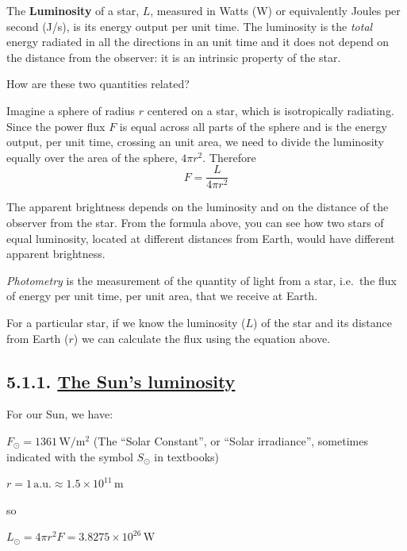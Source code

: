 \documentclass[
  letterpaper,
  DIV=11,
  numbers=noendperiod]{scrreprt}
\begin{document}
The \textbf{Luminosity} of a star, \(L\), measured in Watts (W) or
equivalently Joules per second (J/s), is its energy output per unit
time. The luminosity is the \emph{total} energy radiated in all the
directions in an unit time and it does not depend on the distance from
the observer: it is an intrinsic property of the star.

How are these two quantities related?

Imagine a sphere of radius \(r\) centered on a star, which is
isotropically radiating. Since the power flux \(F\) is equal across all
parts of the sphere and is the energy output, per unit time, crossing an
unit area, we need to divide the luminosity equally over the area of the
sphere, \(4\pi r^2\). Therefore \begin{equation}
F = \frac{L}{4\pi r^2}
\end{equation}

The apparent brightness depends on the luminosity and on the distance of
the observer from the star. From the formula above, you can see how two
stars of equal luminosity, located at different distances from Earth,
would have different apparent brightness.

\emph{Photometry} is the measurement of the quantity of light from a
star, i.e.~the flux of energy per unit time, per unit area, that we
receive at Earth.

For a particular star, if we know the luminosity (\(L\)) of the star and
its distance from Earth (\(r\)) we can calculate the flux using the
equation above.

\hypertarget{the-suns-luminosity}{%
\subsection{\texorpdfstring{5.1.1. \protect\hyperlink{toc0_}{The Sun's
luminosity}}{5.1.1. The Sun's luminosity}}\label{the-suns-luminosity}}

For our Sun, we have:

\(F_\odot = 1361\, \mathrm{W/m^2}\) (The ``Solar Constant'', or ``Solar
irradiance'', sometimes indicated with the symbol \(S_\odot\) in
textbooks)

\(r = 1\, \mathrm{a.u.} \approx 1.5\times 10^{11}\, \mathrm{m}\)

so

\(L_\odot = 4\pi r^2 F = 3.8275 \times 10^{26}\, \mathrm{W}\)
\end{document}
